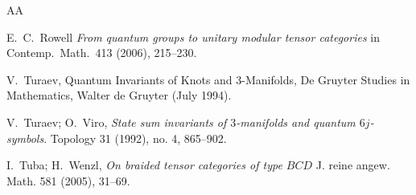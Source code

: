 \documentclass[12pt,psamsfonts]{amsart}
\numberwithin{equation}{section}
\theoremstyle{definition}
\begin{document}
\begin{thebibliography}{AA}


 E.\ C.\ Rowell \emph{From quantum groups to unitary modular tensor categories}
in Contemp.\ Math.\ {413} (2006), 215--230.











V.\ Turaev, Quantum Invariants of Knots and 3-Manifolds, De Gruyter Studies in
Mathematics, Walter de Gruyter (July 1994).

V.\ Turaev; O.\ Viro, \emph{State sum invariants of $3$-manifolds and quantum $6j$-symbols}.
Topology 31 (1992), no. 4, 865--902.


 I.\ Tuba; H.\ Wenzl, \emph{On braided tensor categories of type $BCD$} J. reine angew. Math. 581 (2005), 31--69.


\end{thebibliography}
\end{document}
